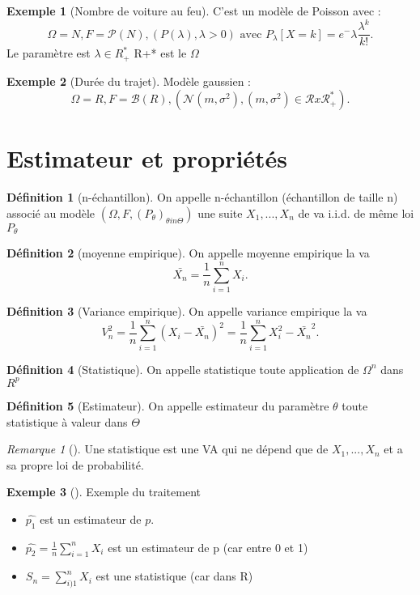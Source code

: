\documentclass{article}
\theoremstyle{plain}%
\theoremstyle{definition}
\newtheorem{defn}{Définition}[section]
\newtheorem{exmp}{Exemple}[section]
\theoremstyle{remark}
\newtheorem*{rem}{Remarque}
\begin{document}
\begin{exmp}[Nombre de voiture au feu]
    C'est un modèle de Poisson avec : 
    \[
        \Omega = N, F = \mathcal{P}(N), (P(\lambda), \lambda > 0) \text{ avec } P_{\lambda }[X=k] = e^-{\lambda } \frac{\lambda ^k}{k!}
    .\]
    Le paramètre est $ \lambda \in R_+^*$ R+* est le $ \Omega  $ 
\end{exmp}

\begin{exmp}[Durée du trajet]
    Modèle gaussien : \\
    \[
        \Omega = R, F = \mathcal{B}(R), (\mathcal{N}(m, \sigma  ^2), (m, \sigma ^2) \in \mathcal{R}x \mathcal{R_+^*})
    .\]    
\end{exmp}

\section{Estimateur et propriétés}
\begin{defn}[n-échantillon]
    On appelle n-échantillon (échantillon de taille n) associé au modèle $ (\Omega , F, (P_{\theta})_{\theta in \Theta }) $ une suite $ X_1, ..., X_n $ de va i.i.d. de même loi $ P_{\theta } $ 
\end{defn}
\begin{defn}[moyenne empirique]
    On appelle moyenne empirique la va 
    \[
        \bar{X_n} = \frac{1}{n} \sum_{i=1}^{n} X_i
    .\]
\end{defn}
\begin{defn}[Variance empirique]
    On appelle variance empirique la va 
    \[
        V_n^2 = \frac{1}{n}\sum_{i=1}^{n}(X_i - \bar{X _{n} })^2 = \frac{1}{n}\sum_{i=1}^{n}X_i^2 - \bar{X _{n} }^2
    .\]
\end{defn}
\begin{defn}[Statistique]
    On appelle statistique toute application de $ \Omega ^n $ dans $ R^p $ 
\end{defn}
\begin{defn}[Estimateur]
    On appelle estimateur du paramètre $ \theta  $ toute statistique à valeur dans $ \Theta  $ 
\end{defn}
\begin{rem}[]
    Une statistique est une VA qui ne dépend que de $ X_1, ..., X_n $ et a sa propre loi de probabilité.
\end{rem}
\begin{exmp}[]
    Exemple du traitement  \\\begin{itemize}
        \item $ \hat{p_1} $ est un estimateur de $ p $.  
        \item $ \hat{p_2} = \frac{1}{n}\sum_{i=1}^{n}X_i$ est un estimateur de p (car entre 0 et 1)
        \item $ S_n = \sum_{i)1}^{n}X_i $ est une statistique (car dans R)
    \end{itemize}
\end{exmp}
\end{document}
